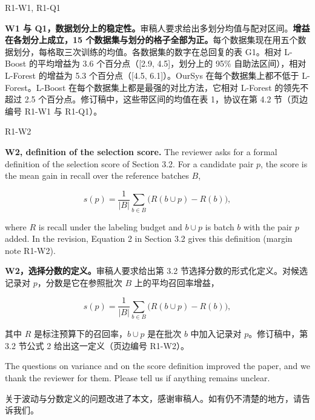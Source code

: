 \documentclass[a4paper,fontset=none,zihao=5]{ctexart}
\begin{document}
\begin{rbgroup}[(1 of 2)]{R1-W1, R1-Q1}
\begin{responsezh}
\textbf{W1 与 Q1，数据划分上的稳定性。}审稿人要求给出多划分均值与配对区间。\textbf{增益在各划分上成立，15 个数据集与划分的格子全部为正。}每个数据集现在用五个数据划分，每格取三次训练的均值。各数据集的数字在总回复的表 G1。相对 L-Boost 的平均增益为 3.6 个百分点（[2.9, 4.5]，划分上的 95\% 自助法区间），相对 L-Forest 的增益为 5.3 个百分点（[4.5, 6.1]）。OurSys 在每个数据集上都不低于 L-Forest。L-Boost 在每个数据集上都是最强的对比方法，它相对 L-Forest 的领先不超过 2.5 个百分点。修订稿中，这些带区间的均值在表 1，协议在第 4.2 节（页边编号 R1-W1 与 R1-Q1）。
\end{responsezh}
\end{rbgroup}


\begin{rbgroup}{R1-W2}
\begin{responseen}
\textbf{W2, definition of the selection score.} The reviewer asks for a formal definition of the selection score of Section 3.2. For a candidate pair $p$, the score is the mean gain in recall over the reference batches $B$,

\[ s(p) = \frac{1}{|B|} \sum_{b \in B} \big( R(b \cup p) - R(b) \big) , \]

where $R$ is recall under the labeling budget and $b \cup p$ is batch $b$ with the pair $p$ added. In the revision, Equation 2 in Section 3.2 gives this definition (margin note R1-W2).
\end{responseen}
\begin{responsezh}
\textbf{W2，选择分数的定义。}审稿人要求给出第 3.2 节选择分数的形式化定义。对候选记录对 $p$，分数是它在参照批次 $B$ 上的平均召回率增益，

\[ s(p) = \frac{1}{|B|} \sum_{b \in B} \big( R(b \cup p) - R(b) \big) , \]

其中 $R$ 是标注预算下的召回率，$b \cup p$ 是在批次 $b$ 中加入记录对 $p$。修订稿中，第 3.2 节公式 2 给出这一定义（页边编号 R1-W2）。
\end{responsezh}
\end{rbgroup}

\begin{rbgroup}[结尾]{}
\begin{responseen}
The questions on variance and on the score definition improved the paper, and we thank the reviewer for them. Please tell us if anything remains unclear.
\end{responseen}
\begin{responsezh}
关于波动与分数定义的问题改进了本文，感谢审稿人。如有仍不清楚的地方，请告诉我们。
\end{responsezh}
\end{rbgroup}
\end{document}
